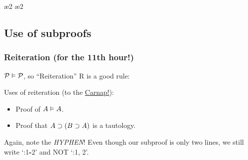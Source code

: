 \begin{frame}
  \begin{fitchproof}
     \pr{}
    \open
     
    \ae{2}
    \ae{2}
    \close
  \end{fitchproof}
\end{frame}

\subsection{Use of subproofs}

\begin{frame}
  \frametitle{Reiteration (for the 11th hour!)}

  $\mathcal{P} \vDash \mathcal{P}$, so ``Reiteration'' R is a good rule:

  \begin{fitchproof}
     
  \end{fitchproof}

  Uses of reiteration (to the \href{https://tinyurl.com/2p82rpv5}{Carnap!}):

  \begin{itemize}[<+->]
    \item Proof of $A \vDash A$.
    \item Proof that $A \supset (B \supset A)$ is a tautology.
  \end{itemize}
\end{frame}

\begin{frame}
  \begin{fitchproof}
    \open
     
    \close
  \end{fitchproof}

Again, note the \emph{HYPHEN}! Even though our subproof is only two lines, we still write `:1\textbf{-}2' and NOT `:1, 2'. 
\end{frame}

\begin{frame}
  \begin{fitchproof}
    \open
     
    \open
     
    \close
    \close
  \end{fitchproof}
\end{frame}


